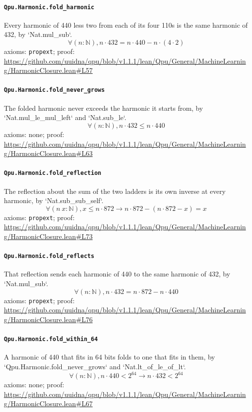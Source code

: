 \documentclass[11pt]{article}
\begin{document}
\paragraph{\texttt{Qpu.Harmonic.fold\_harmonic}}
Every harmonic of 440 less two from each of its four 110s is the same harmonic of 432, by `Nat.mul\_sub`.
\[ \forall (n : \mathbb{N}), n \cdot 432 = n \cdot 440 - n \cdot (4 \cdot 2) \]
\noindent axioms: \texttt{propext}; proof: \url{https://github.com/uuidna/qpu/blob/v1.1.1/lean/Qpu/General/MachineLearning/HarmonicClosure.lean\#L57}

\paragraph{\texttt{Qpu.Harmonic.fold\_never\_grows}}
The folded harmonic never exceeds the harmonic it starts from, by `Nat.mul\_le\_mul\_left` and `Nat.sub\_le`.
\[ \forall (n : \mathbb{N}), n \cdot 432 \le n \cdot 440 \]
\noindent axioms: none; proof: \url{https://github.com/uuidna/qpu/blob/v1.1.1/lean/Qpu/General/MachineLearning/HarmonicClosure.lean\#L63}

\paragraph{\texttt{Qpu.Harmonic.fold\_reflection}}
The reflection about the sum of the two ladders is its own inverse at every harmonic, by `Nat.sub\_sub\_self`.
\[ \forall (n\ x : \mathbb{N}), x \le n \cdot 872 \to n \cdot 872 - (n \cdot 872 - x) = x \]
\noindent axioms: \texttt{propext}; proof: \url{https://github.com/uuidna/qpu/blob/v1.1.1/lean/Qpu/General/MachineLearning/HarmonicClosure.lean\#L73}

\paragraph{\texttt{Qpu.Harmonic.fold\_reflects}}
That reflection sends each harmonic of 440 to the same harmonic of 432, by `Nat.mul\_sub`.
\[ \forall (n : \mathbb{N}), n \cdot 432 = n \cdot 872 - n \cdot 440 \]
\noindent axioms: \texttt{propext}; proof: \url{https://github.com/uuidna/qpu/blob/v1.1.1/lean/Qpu/General/MachineLearning/HarmonicClosure.lean\#L76}

\paragraph{\texttt{Qpu.Harmonic.fold\_within\_64}}
A harmonic of 440 that fits in 64 bits folds to one that fits in them, by `Qpu.Harmonic.fold\_never\_grows` and `Nat.lt\_of\_le\_of\_lt`.
\[ \forall (n : \mathbb{N}), n \cdot 440 < 2 ^{64} \to n \cdot 432 < 2 ^{64} \]
\noindent axioms: none; proof: \url{https://github.com/uuidna/qpu/blob/v1.1.1/lean/Qpu/General/MachineLearning/HarmonicClosure.lean\#L67}
\end{document}
